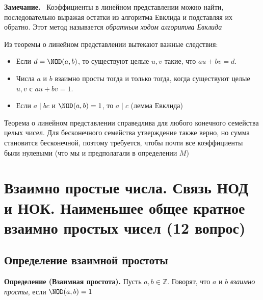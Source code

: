 \documentclass[a4paper,12pt]{article}
\newcommand{\myremark}{\textbf{Замечание.}\ }
\theoremstyle{definition}
\theoremstyle{plain}
\theoremstyle{remark}
\begin{document}
	\myremark
	Коэффициенты в линейном представлении можно найти, последовательно выражая остатки из алгоритма Евклида и подставляя их обратно. Этот метод называется \textit{обратным ходом алгоритма Евклида}
	
	\begin{tcolorbox}[colback=purple!5, colframe=purple!50!black, title=Заметочка: Следствия теоремы]
	Из теоремы о линейном представлении вытекают важные следствия:
	\begin{itemize}
	\item Если $d = \NOD(a, b)$, то существуют целые $u, v$ такие, что $au + bv = d$.
	\item Числа $a$ и $b$ взаимно просты тогда и только тогда, когда существуют целые $u, v$ с $au + bv = 1$.
	\item Если $a \mid bc$ и $\NOD(a, b) = 1$, то $a \mid c$ (лемма Евклида)
	\end{itemize}
	\end{tcolorbox}
	
	\begin{tcolorbox}[colback=yellow!5, colframe=orange!60!black, title=Важное замечание]
	Теорема о линейном представлении справедлива для любого конечного семейства целых чисел. Для бесконечного семейства утверждение также верно, но сумма становится бесконечной, поэтому требуется, чтобы почти все коэффициенты были нулевыми (что мы и предполагали в определении $M$)
	\end{tcolorbox}








	
	

	
	\newpage
	\section{Взаимно простые числа. Связь НОД и НОК. Наименьшее общее кратное взаимно простых чисел (12 вопрос)}
	
	\subsection{Определение взаимной простоты}
	
	\noindent \textbf{Определение (Взаимная простота).}
	Пусть $a, b \in \mathbb{Z}$. Говорят, что $a$ и $b$ \textit{взаимно просты}, если $\NOD(a, b) = 1$
	
\end{document}
